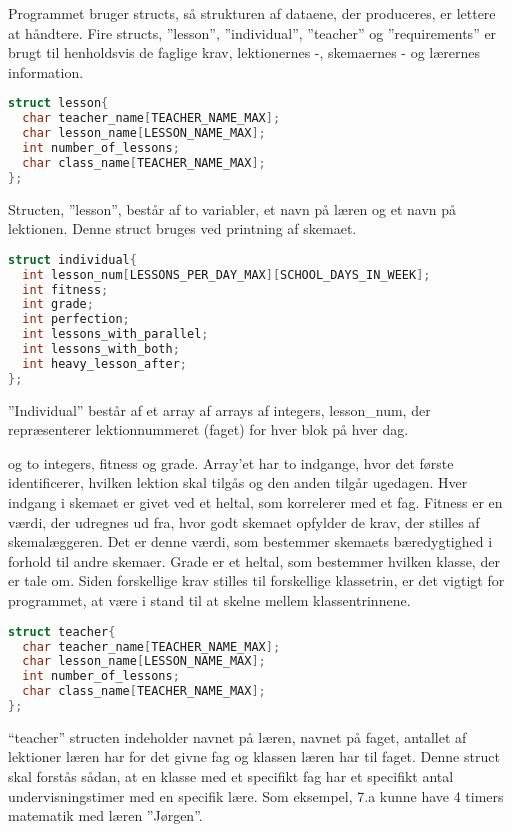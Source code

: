 Programmet bruger structs, så strukturen af dataene, der produceres, er lettere at håndtere. Fire structs, ”lesson”, ”individual”, ”teacher” og ”requirements” er brugt til henholdsvis de faglige krav, lektionernes -, skemaernes - og lærernes information.
\begin{lstlisting}[language = C]
struct lesson{
  char teacher_name[TEACHER_NAME_MAX];
  char lesson_name[LESSON_NAME_MAX];
  int number_of_lessons;
  char class_name[TEACHER_NAME_MAX];
};
\end{lstlisting}

Structen, ”lesson”, består af to variabler, et navn på læren og et navn på lektionen. Denne struct bruges ved printning af skemaet. %

\begin{lstlisting}[language = C]
struct individual{
  int lesson_num[LESSONS_PER_DAY_MAX][SCHOOL_DAYS_IN_WEEK];
  int fitness;
  int grade;
  int perfection;
  int lessons_with_parallel;
  int lessons_with_both;
  int heavy_lesson_after;
};
\end{lstlisting}

”Individual” består af et array af arrays af integers, lesson_num, der repræsenterer lektionnummeret (faget) for hver blok på hver dag.


 og to integers, fitness og grade. Array’et har to indgange, hvor det første identificerer, hvilken lektion skal tilgås og den anden tilgår ugedagen. Hver indgang i skemaet er givet ved et heltal, som korrelerer med et fag. Fitness er en værdi, der udregnes ud fra, hvor godt skemaet opfylder de krav, der stilles af skemalæggeren. Det er denne værdi, som bestemmer skemaets bæredygtighed i forhold til andre skemaer. Grade er et heltal, som bestemmer hvilken klasse, der er tale om. Siden forskellige krav stilles til forskellige klassetrin, er det vigtigt for programmet, at være i stand til at skelne mellem klassentrinnene.

\begin{lstlisting}[language = C]
struct teacher{
  char teacher_name[TEACHER_NAME_MAX];
  char lesson_name[LESSON_NAME_MAX];
  int number_of_lessons;
  char class_name[TEACHER_NAME_MAX];
};
\end{lstlisting}

“teacher” structen indeholder navnet på læren, navnet på faget, antallet af lektioner læren har for det givne fag og klassen læren har til faget. Denne struct skal forstås sådan, at en klasse med et specifikt fag har et specifikt antal undervisningstimer med en specifik lære. Som eksempel, 7.a kunne have 4 timers matematik med læren ”Jørgen”. 

